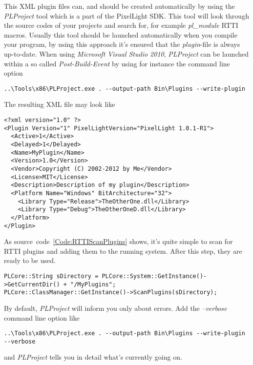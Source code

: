 This \ac{XML} plugin files can, and should be created automatically by using the \emph{PLProject} tool which is a part of the PixelLight \ac{SDK}. This tool will look through the source codes of your projects and search for, for example \emph{pl\_module} \ac{RTTI} macros. Usually this tool should be launched automatically when you compile your program, by using this approach it's ensured that the \emph{plugin}-file is always up-to-date. When using \emph{Microsoft Visual Studio 2010}, \emph{PLProject} can be launched within a so called \emph{Post-Build-Event} by using for instance the command line option
\begin{verbatim}
..\Tools\x86\PLProject.exe . --output-path Bin\Plugins --write-plugin
\end{verbatim}
The resulting \ac{XML} file may look like
\begin{verbatim}
<?xml version="1.0" ?>
<Plugin Version="1" PixelLightVersion="PixelLight 1.0.1-R1">
  <Active>1</Active>
  <Delayed>1</Delayed>
  <Name>MyPlugin</Name>
  <Version>1.0</Version>
  <Vendor>Copyright (C) 2002-2012 by Me</Vendor>
  <License>MIT</License>
  <Description>Description of my plugin</Description>
  <Platform Name="Windows" BitArchitecture="32">
    <Library Type="Release">TheOtherOne.dll</Library>
    <Library Type="Debug">TheOtherOneD.dll</Library>
  </Platform>
</Plugin>
\end{verbatim}

As source~code~\ref{Code:RTTIScanPlugins} shows, it's quite simple to scan for \ac{RTTI} plugins and adding them to the running system. After this step, they are ready to be used.
\begin{lstlisting}[float=htb,label=Code:RTTIScanPlugins,caption={Scanning for \ac{RTTI} plugins to add}]
PLCore::String sDirectory = PLCore::System::GetInstance()->GetCurrentDir() + "/MyPlugins";
PLCore::ClassManager::GetInstance()->ScanPlugins(sDirectory);
\end{lstlisting}

By default, \emph{PLProject} will inform you only about errors. Add the \emph{--verbose} command line option like
\begin{verbatim}
..\Tools\x86\PLProject.exe . --output-path Bin\Plugins --write-plugin --verbose
\end{verbatim}
and \emph{PLProject} tells you in detail what's currently going on.


